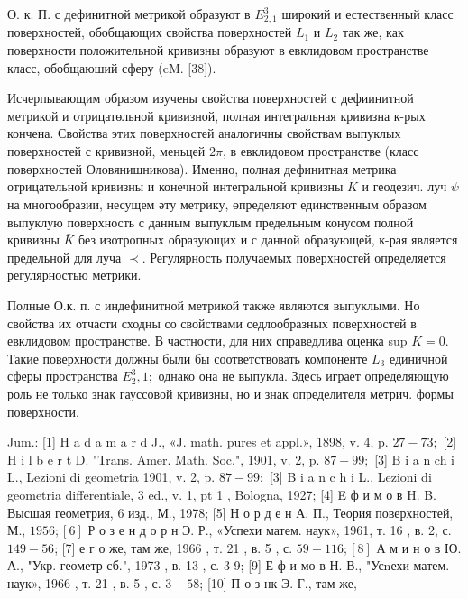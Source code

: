 \documentclass[10pt]{article}
\begin{document}
О. к. П. с дефинитной метрикой образуют в $E_{2,1}^{3}$ широкий и естественный класс поверхностей, обобщающих свойства поверхностей $L_{1}$ и $L_{2}$ так же, как поверхности положительной кривизны образуют в евклидовом пространстве класс, обобщаюший сферу (cM. [38]).

Исчерпывающим образом изучены свойства поверхностей с дефиинитной метрикой и отрицатөльной кривизной, полная интегральная кривизна к-рых кончена. Свойства этих поверхностей аналогичны свойствам выпуклых поверхностей с кривизной, меньцей $2 \pi$, в евклидовом пространстве (класс повөрхностей Оловянишникова). Именно, полная дефинитная метрика отрицательной кривизны и конечной интегральной кривизны $\tilde{K}$ и геодезич. луч $\mathcal{\psi}$ на многообразии, несущем әту метрику, өпределяют единственным образом выпуклую поверхность с данным выпуклым предельным конусом полной кривизны $\bar{K}$ без изотропных образующих и с данной образующей, к-рая является предельной для луча $\prec$. Регулярность получаемых поверхностей определяется регулярностью метрики.

Полные О.к. п. с индефинитной метрикой также являются выпуклыми. Но свойства их отчасти сходны со свойствами седлообразных поверхностей в евклидовом пространстве. В частности, для них справедлива оценка sup $K=0$. Такие поверхности должны были бы соответствовать компоненте $L_{3}$ единичной сферы пространства $E_{2}^{3}, 1 ;$ однако она не выпукла. Здесь играет определяющую роль не только знак гауссовой кривизны, но и знак определителя метрич. формы поверхности.

Jum.: [1] H a d a m a r d J., «J. math. pures et appl.», 1898, v. 4, p. $27-73 ;$ [2] H i l b e r t D. "Trans. Amer. Math. Soc.",
1901, v. 2, p. $87-99 ;$ [3] B i a n ch i L., Lezioni di geometria 1901, v. 2, p. $87-99 ;$ [3] B i a n c h i L., Lezioni di geometria
differentiale, 3 ed., v. 1, pt 1 , Bologna, 1927; [4] E ф и м о в H. B. Высшая геометрия, 6 изд., М., 1978; [5] Н о р д е н А. П., Теория поверхностей, М., $1956 ;[6]$ Р о з е н д о р н Э. Р., «Успехи матем. наук», 1961, т. 16 , в. 2, с. $149-56$; [7] е г о же, там же, 1966 , т. 21 , в. 5 , с. $59-116 ;[8]$ А м и н о в Ю. А., "Укр. геометр сб.", 1973 , в. 13 , с. 3-9; [9] Е ф и мо в Н. В., "Усnехи матем. наук», 1966 , т. 21 , в. 5 , с. $3-58$; [10] П о з нк Э. Г., там же,
\end{document}

